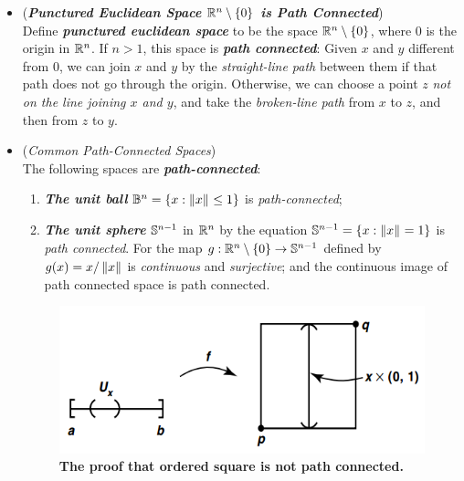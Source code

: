 \documentclass[11pt]{article}
\begin{document}
\begin{itemize}
\item \begin{example} (\emph{\textbf{Punctured Euclidean Space ${\mathbb R}^n \setminus \left\{0\right\}$ is Path Connected}})\\
Define \emph{\textbf{punctured euclidean space}} to be the space ${\mathbb R}^n \setminus \left\{0\right\}$, where $0$ is the origin in ${\mathbb R}^n$. If $n > 1$, this space is \emph{\textbf{path connected}}: Given $x$ and $y$ different from $0$, we can join $x$ and $y$ by the \emph{straight-line path} between them if that path does not go through
the origin. Otherwise, we can choose a point $z$ \emph{not on the line joining $x$ and $y$}, and take the \emph{broken-line path} from $x$ to $z$, and then from $z$ to $y$.
\end{example}

\item 
\begin{example} (\emph{Common Path-Connected Spaces})\\
The following spaces are \emph{\textbf{path-connected}}:
\begin{enumerate}
\item \emph{\textbf{The unit ball}} ${\mathbb B}^n = \left\{x: \left\|x\right\|_{} \le 1\right\}$ is \emph{path-connected};
\item \emph{\textbf{The unit sphere}} ${\mathbb S}^{n-1}$ in ${\mathbb R}^n$ by the equation ${\mathbb S}^{n-1} = \left\{x: \left\|x\right\|_{} = 1\right\}$ is \emph{path connected}. For the map $g : {\mathbb R}^n \setminus \left\{0\right\}\rightarrow {\mathbb S}^{n-1}$ defined by $g(x)= x/\left\|x\right\|_{}$ is \textit{continuous} and \emph{surjective}; and the continuous image of path connected space is path connected.
\end{enumerate}
\end{example}

\begin{figure}
\begin{minipage}[t]{1\linewidth}
  \centering
  \centerline{\includegraphics[scale = 0.5]{order_square_not_path_connected.png}}
\end{minipage}
\caption{\footnotesize{\textbf{The proof that ordered square is not path connected. \citep{munkres2000topology}}}}
\label{fig: order_square_not_path_connected}
\end{figure}




\end{itemize}
\end{document}
